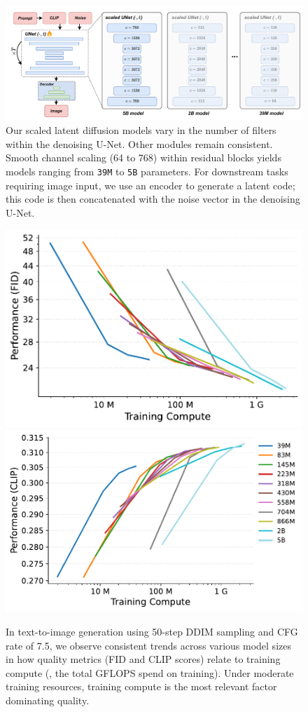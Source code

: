 \begin{figure}[ht]
    \centering
    \includegraphics[width=.9\linewidth]{cp2/figures/ldm_architecture.pdf}
    \caption{Our scaled latent diffusion models vary in the number of filters within the denoising U-Net.  Other modules remain consistent.  Smooth channel scaling (64 to 768) within residual blocks yields models ranging from \texttt{39M} to \texttt{5B} parameters. For downstream tasks requiring image input, we use an encoder to generate a latent code; this code is then concatenated with the noise vector in the denoising U-Net.}
    \label{fig:scaling_arch}
\end{figure}

\begin{figure}[!h]
    \centering
    \includegraphics[height=.315\linewidth]{cp2/figures/t2i_fid_compute.pdf}
    \includegraphics[height=.315\linewidth]{cp2/figures/t2i_clip_compute.pdf}
    \caption{In text-to-image generation using 50-step DDIM sampling and CFG rate of 7.5, we observe consistent trends across various model sizes in how quality metrics (FID and CLIP scores) relate to training compute (\ie, the total GFLOPS spend on training). 
    Under moderate training resources, training compute is the most relevant factor dominating quality.
    }
    \label{fig:t2i_compute}
\end{figure}


